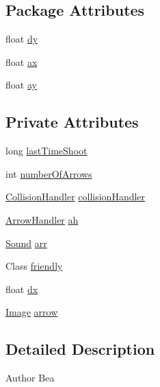 \subsection*{Package Attributes}
\begin{DoxyCompactItemize}
\item 
float \mbox{\hyperlink{classitems_1_1weapons_1_1_bow_a64b7302a20f953d5940e5063d523d772}{dy}}
\item 
float \mbox{\hyperlink{classitems_1_1weapons_1_1_bow_aff7d073599101d3aaad0f525ef067eac}{ax}}
\item 
float \mbox{\hyperlink{classitems_1_1weapons_1_1_bow_a3180294cbe39f9b47eea37815dc1c4f6}{ay}}
\end{DoxyCompactItemize}
\subsection*{Private Attributes}
\begin{DoxyCompactItemize}
\item 
long \mbox{\hyperlink{classitems_1_1weapons_1_1_bow_aa0be9c972ce94d1a72b0285e44415ccf}{last\+Time\+Shoot}}
\item 
int \mbox{\hyperlink{classitems_1_1weapons_1_1_bow_af7bf7150668d59f26c24278fe246d852}{number\+Of\+Arrows}}
\item 
\mbox{\hyperlink{classentities_1_1_collision_handler}{Collision\+Handler}} \mbox{\hyperlink{classitems_1_1weapons_1_1_bow_a58b10332a113699f11dabaf41f76560a}{collision\+Handler}}
\item 
\mbox{\hyperlink{classitems_1_1weapons_1_1_arrow_handler}{Arrow\+Handler}} \mbox{\hyperlink{classitems_1_1weapons_1_1_bow_a04ecddeefa27f007f2e29a8fc8298e23}{ah}}
\item 
\mbox{\hyperlink{classorg_1_1newdawn_1_1slick_1_1_sound}{Sound}} \mbox{\hyperlink{classitems_1_1weapons_1_1_bow_a5b267dc01cddeb22261f8d5dde8bedc9}{arr}}
\item 
Class \mbox{\hyperlink{classitems_1_1weapons_1_1_bow_aa10796e9bea482d14d3788719c606647}{friendly}}
\item 
float \mbox{\hyperlink{classitems_1_1weapons_1_1_bow_a5f5ced169bab348188e9b06ac6862a2b}{dx}}
\item 
\mbox{\hyperlink{classorg_1_1newdawn_1_1slick_1_1_image}{Image}} \mbox{\hyperlink{classitems_1_1weapons_1_1_bow_a6bb996a10bf375e8a93d452fb7ee70a9}{arrow}}
\end{DoxyCompactItemize}


\subsection{Detailed Description}
\begin{DoxyAuthor}{Author}
Bea 
\end{DoxyAuthor}


